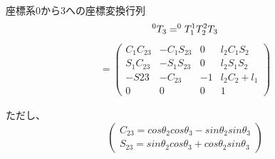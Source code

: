 \documentclass[a4j]{jarticle}			%
\begin{document}
\begin{multicols}{2} %

座標系0から3への座標変換行列 
$$
	^{0}T_{3}=^{0}T_{1} ^{1}T_{2} ^{2}T_{3} \\
$$
\begin{equation*}
	\begin{array}{cc}
		=
		\left( 
			\begin{array}{cccc}
				C_1C_{23} & -C_1S_{23} & 0 & l_2C_1S_2 \\
				S_1C_{23} & -S_1S_{23} & 0 & l_2S_1S_2 \\
				-S{23} & -C_{23} & -1 & l_2C_2 + l_1 \\
				0 & 0 & 0 & 1 
			\end{array}
		\right)
	\end{array}
\end{equation*}

ただし、
\begin{equation*}
	\left(
	\begin{split}
		C_{23} = cos\theta_2cos\theta_3-sin\theta_2sin\theta_3\\
		S_{23} = sin\theta_2cos\theta_3+cos\theta_2sin\theta_3	
	\end{split}
	\right)
\end{equation*}


\end{multicols}
\end{document}
